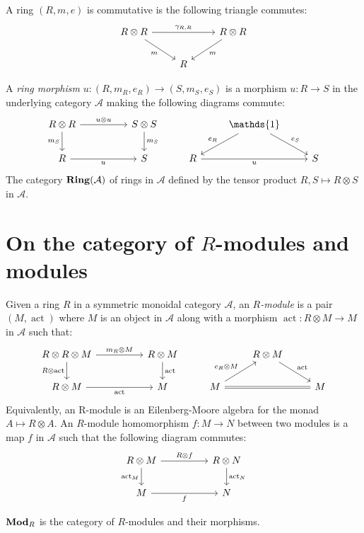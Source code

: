 \documentclass[8pt]{article}
\theoremstyle{definition}
\theoremstyle{definition}
\theoremstyle{definition}
\theoremstyle{definition}
\theoremstyle{definition}
\theoremstyle{definition}
\theoremstyle{definition}
\theoremstyle{definition}
\theoremstyle{definition}
\theoremstyle{definition}
\theoremstyle{definition}
\theoremstyle{definition}
\theoremstyle{definition}
\theoremstyle{definition}
\theoremstyle{question}
\begin{document}
A ring $(R, m, e)$ is commutative is the following triangle commutes:
\[
\begin{tikzcd}
R \otimes R \ar[dr, "m"'] \ar[rr, "\gamma_{R,R}"] && R \otimes R \ar[dl, "m"] \\
& R
\end{tikzcd}
\]

A \emph{ring morphism} $u : (R, m_R, e_R) \to (S, m_S, e_S)$ is a morphism $u : R \to S$ in the underlying category $\mathcal{A}$ making the following diagrams commute:
\[
\begin{tikzcd}
  R \otimes R \ar[d, "m_S"'] \ar[rr, "u \otimes u"] && S \otimes S \ar[d, "m_S"] && \mathds{1} \ar[dr, "e_S"] \ar[dl, "e_R"'] \\
  R \ar[rr, "u"'] && S                                                 &   R \ar[rr, "u"'] && S
\end{tikzcd}
\]
The category ${\bf Ring}(\mathcal{A})$ of rings in $\mathcal{A}$ defined by the tensor product $R,S \mapsto R \otimes S$ in $\mathcal{A}$.

\section{On the category of $R$-modules and modules}

Given a ring $R$ in a symmetric monoidal category $\mathcal{A}$, an \emph{$R$-module} is a pair $(M, \operatorname{act})$ where $M$ is an object
in $\mathcal{A}$ along with a morphism $\operatorname{act} : R \otimes M \to M$ in $\mathcal{A}$ such that:
\[
\begin{tikzcd}
  R \otimes R \otimes M \ar[d, "R \otimes \operatorname{act}"'] \ar[rr, "m_R \otimes M"] && R \otimes M \ar[d, "\operatorname{act}"] && R \otimes M \ar[dr, "\operatorname{act}"] \\
  R \otimes M \ar[rr, "\operatorname{act}"'] && M & M \ar[ur, "e_R \otimes M"] \ar[rr, equal] && M
\end{tikzcd}
\]
Equivalently, an R-module is an Eilenberg-Moore algebra for the monad $A \mapsto R \otimes A$. An $R$-module homomorphism $f : M \to N$
between two modules is a map $f$ in $\mathcal{A}$ such that the following diagram commutes:
\[
\begin{tikzcd}
  R \otimes M \ar[rr, "R \otimes f"] \ar[d, "\operatorname{act}_M"'] && R \otimes N \ar[d, "\operatorname{act}_N"]\\
  M \ar[rr, "f"'] && N
\end{tikzcd}
\]

${\bf Mod}_R$ is the category of $R$-modules and their morphisms.
\end{document}
